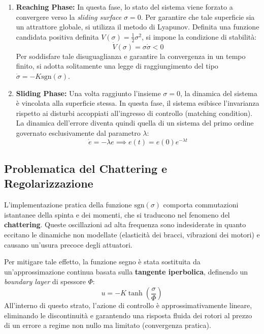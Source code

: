 \begin{enumerate}
    \item \textbf{Reaching Phase:} In questa fase, lo stato del sistema viene forzato a convergere verso la \textit{sliding surface} $\sigma = 0$. Per garantire che tale superficie sia un attrattore globale, si utilizza il metodo di Lyapunov. Definita una funzione candidata positiva definita $V(\sigma) = \frac{1}{2}\sigma^2$, si impone la condizione di stabilità:
    \begin{equation}
        \dot{V}(\sigma) = \sigma \dot{\sigma} < 0
    \end{equation}
    Per soddisfare tale disuguaglianza e garantire la convergenza in un tempo finito, si adotta solitamente una legge di raggiungimento del tipo $\dot{\sigma} = -K \text{sgn}(\sigma)$.
    
    \item \textbf{Sliding Phase:} Una volta raggiunto l'insieme $\sigma = 0$, la dinamica del sistema è vincolata alla superficie stessa. In questa fase, il sistema esibisce l'invarianza rispetto ai disturbi accoppiati all'ingresso di controllo (matching condition). La dinamica dell'errore diventa quindi quella di un sistema del primo ordine governato esclusivamente dal parametro $\lambda$:
    \begin{equation}
        \dot{e} = -\lambda e \implies e(t) = e(0)e^{-\lambda t}
    \end{equation}
\end{enumerate}

\subsection{Problematica del Chattering e Regolarizzazione}
L'implementazione pratica della funzione $\text{sgn}(\sigma)$ comporta commutazioni istantanee della spinta e dei momenti, che si traducono nel fenomeno del \textbf{chattering}. Queste oscillazioni ad alta frequenza sono indesiderate in quanto eccitano le dinamiche non modellate (elasticità dei bracci, vibrazioni dei motori) e causano un'usura precoce degli attuatori.

Per mitigare tale effetto, la funzione segno è stata sostituita da un'approssimazione continua basata sulla \textbf{tangente iperbolica}, definendo un \textit{boundary layer} di spessore $\Phi$:
\begin{equation}
    u = -K \tanh\left(\frac{\sigma}{\Phi}\right)
\end{equation}
All'interno di questo strato, l'azione di controllo è approssimativamente lineare, eliminando le discontinuità e garantendo una risposta fluida dei rotori al prezzo di un errore a regime non nullo ma limitato (convergenza pratica).
\clearpage


